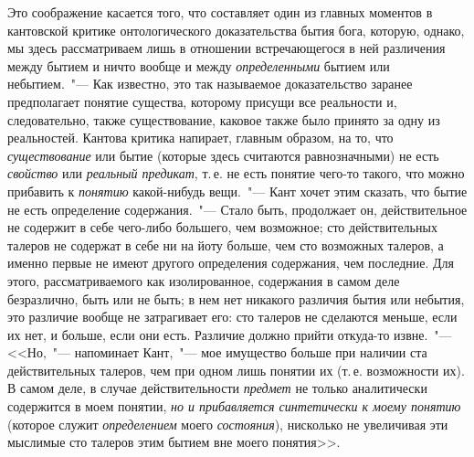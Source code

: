 Это соображение касается того, что составляет один
из главных моментов в кантовской критике онтологического
доказательства бытия бога, которую, однако, мы
здесь рассматриваем лишь в отношении встречающегося
в ней различения между бытием и ничто вообще и между
\emph{определенными} бытием или небытием.~"--- Как известно,
это так называемое доказательство заранее предполагает
понятие существа, которому присущи все реальности и,
следовательно, также существование, каковое также было
принято за одну из реальностей. Кантова критика напирает,
главным образом, на то, что \emph{существование} или бытие
(которые здесь считаются равнозначными) не есть
\emph{свойство} или \emph{реальный предикат}, т.\,е. не есть понятие
чего-то такого, что можно прибавить к \emph{понятию} какой-нибудь
вещи\footnotemark{}.~"--- Кант хочет этим сказать, что бытие не
есть определение содержания.~"--- Стало быть, продолжает
он, действительное не содержит в себе чего-либо большего,
чем возможное; сто действительных талеров не содержат
в себе ни на йоту больше, чем сто возможных
талеров, а именно первые не имеют другого определения
содержания, чем последние. Для этого, рассматриваемого
как изолированное, содержания в самом деле
безразлично, быть или не быть; в нем нет никакого различия
бытия или небытия, это различие вообще не затрагивает
его: сто талеров не сделаются меньше, если их
нет, и больше, если они есть. Различие должно прийти
откуда-то извне.~"--- <<Но,~"--- напоминает Кант,~"--- мое имущество
больше при наличии ста действительных талеров,
чем при одном лишь понятии их (т.\,е. возможности их).
В самом деле, в случае действительности \emph{предмет} не
только аналитически содержится в моем понятии, \emph{но и
прибавляется синтетически к моему понятию} (которое
служит \emph{определением} моего \emph{состояния}), нисколько не увеличивая
эти мыслимые сто талеров этим бытием вне
моего понятия>>\endnotemark{}.



